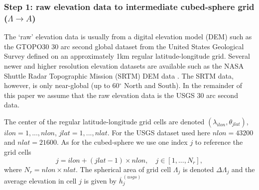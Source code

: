 \documentclass[gmd]{copernicus}
\begin{document}
\subsubsection{Step 1: raw elevation data to intermediate cubed-sphere grid ($\Lambda \rightarrow A$)}
The `raw' elevation data is usually from a digital elevation model (DEM) such as the GTOPO30 30 arc second global dataset from the United States Geological Survey \citep[USGS][]{USGS} defined on an approximately 1km regular latitude-longitude grid. Several newer and higher resolution elevation datasets are available such as the NASA Shuttle Radar Topographic Mission (SRTM) DEM data \citep{SRTM}. The SRTM data, however, is only near-global (up to 60$^\circ$ North and South). In the remainder of this paper we assume that the raw elevation data is the USGS 30 arc second data.

The center of the regular latitude-longitude grid cells are denoted $(\lambda_{ilon},\theta_{jlat})$, $ilon=1,..., nlon$, $jlat=1, ..., nlat$. For the USGS dataset used here $nlon=43200$ and $nlat=21600$. As for the cubed-sphere we use one index $j$ to reference the grid cells
\begin{equation}
j=ilon+(jlat-1)\times nlon, \quad j\in [1, ..., N_r],
\end{equation} 
where $N_r=nlon\times nlat$. The spherical area of grid cell $\Lambda_j$ is denoted $\Delta \Lambda_j$ and the average elevation in cell $j$ is given by $\overline{h}^{(usgs)}_j$ 
\end{document}
